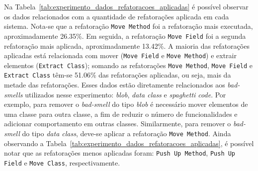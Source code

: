 Na Tabela~\ref{tab:experimento_dados_refatoracoes_aplicadas} é possível observar os dados relacionados com a quantidade de refatorações aplicada em cada sistema. Nota-se que a refatoração \texttt{Move Method} foi a refatoração mais executada, aproximadamente 26.35\%.  Em seguida, a refatoração \texttt{Move Field} foi a segunda refatoração mais aplicada, aproximadamente 13.42\%. A maioria das refatorações aplicadas está relacionada com mover (\texttt{Move Field} e \texttt{Move Method}) e extrair elementos (\texttt{Extract Class}); somando as refatorações \texttt{Move Method}, \texttt{Move Field} e \texttt{Extract Class} têm-se 51.06\% das refatorações aplicadas, ou seja, mais da metade das refatorações. Esses dados estão diretamente relacionados aos \textit{bad-smells} utilizados nesse experimento: \textit{blob}, \textit{data class} e \textit{spaghetti code}. Por exemplo, para remover o \textit{bad-smell} do tipo \textit{blob} é necessário mover elementos de uma classe para outra classe, a fim de reduzir o número de funcionalidades e adicionar comportamento em outras classes. Similarmente, para remover o \textit{bad-smell} do tipo \textit{data class}, deve-se aplicar a refatoração \texttt{Move Method}. Ainda observando a Tabela~\ref{tab:experimento_dados_refatoracoes_aplicadas}, é possível notar que as refatorações menos aplicadas foram: \texttt{Push Up Method}, \texttt{Push Up Field} e \texttt{Move Class}, respectivamente. 

